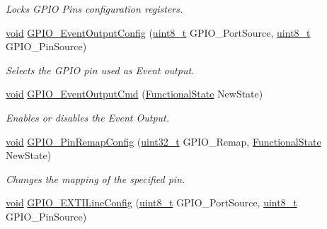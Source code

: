\begin{DoxyCompactItemize}
\begin{DoxyCompactList}\small\item\em Locks G\+P\+IO Pins configuration registers. \end{DoxyCompactList}\item 
\hyperlink{usb__devapi_8h_afabf60e7f57651d6d595a02c75f07cd0}{void} \hyperlink{group___g_p_i_o___exported___functions_ga935f31ed7a86c6cb594cf34313b4b7af}{G\+P\+I\+O\+\_\+\+Event\+Output\+Config} (\hyperlink{_p_e___types_8h_aba7bc1797add20fe3efdf37ced1182c5}{uint8\+\_\+t} G\+P\+I\+O\+\_\+\+Port\+Source, \hyperlink{_p_e___types_8h_aba7bc1797add20fe3efdf37ced1182c5}{uint8\+\_\+t} G\+P\+I\+O\+\_\+\+Pin\+Source)
\begin{DoxyCompactList}\small\item\em Selects the G\+P\+IO pin used as Event output. \end{DoxyCompactList}\item 
\hyperlink{usb__devapi_8h_afabf60e7f57651d6d595a02c75f07cd0}{void} \hyperlink{group___g_p_i_o___exported___functions_gaf13ab3d59e467df44b492f1cdfe2f588}{G\+P\+I\+O\+\_\+\+Event\+Output\+Cmd} (\hyperlink{agilefox_2library_2inc_2stm32f10x__type_8h_ac9a7e9a35d2513ec15c3b537aaa4fba1}{Functional\+State} New\+State)
\begin{DoxyCompactList}\small\item\em Enables or disables the Event Output. \end{DoxyCompactList}\item 
\hyperlink{usb__devapi_8h_afabf60e7f57651d6d595a02c75f07cd0}{void} \hyperlink{group___g_p_i_o___exported___functions_ga64eb76f6211b840daf9829289df4208b}{G\+P\+I\+O\+\_\+\+Pin\+Remap\+Config} (\hyperlink{_p_e___types_8h_a33594304e786b158f3fb30289278f5af}{uint32\+\_\+t} G\+P\+I\+O\+\_\+\+Remap, \hyperlink{agilefox_2library_2inc_2stm32f10x__type_8h_ac9a7e9a35d2513ec15c3b537aaa4fba1}{Functional\+State} New\+State)
\begin{DoxyCompactList}\small\item\em Changes the mapping of the specified pin. \end{DoxyCompactList}\item 
\hyperlink{usb__devapi_8h_afabf60e7f57651d6d595a02c75f07cd0}{void} \hyperlink{group___g_p_i_o___exported___functions_ga8c1f13646d7418827378032a584da653}{G\+P\+I\+O\+\_\+\+E\+X\+T\+I\+Line\+Config} (\hyperlink{_p_e___types_8h_aba7bc1797add20fe3efdf37ced1182c5}{uint8\+\_\+t} G\+P\+I\+O\+\_\+\+Port\+Source, \hyperlink{_p_e___types_8h_aba7bc1797add20fe3efdf37ced1182c5}{uint8\+\_\+t} G\+P\+I\+O\+\_\+\+Pin\+Source)

\end{DoxyCompactItemize}
